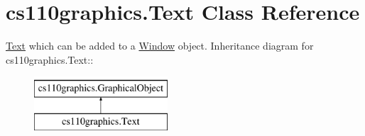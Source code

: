 \hypertarget{classcs110graphics_1_1Text}{
\section{cs110graphics.Text Class Reference}
\label{classcs110graphics_1_1Text}
}


\hyperlink{classcs110graphics_1_1Text}{Text} which can be added to a \hyperlink{classcs110graphics_1_1Window}{Window} object.  
Inheritance diagram for cs110graphics.Text::\begin{figure}[H]
\begin{center}
\leavevmode
\includegraphics[height=2cm]{classcs110graphics_1_1Text}
\end{center}
\end{figure}
